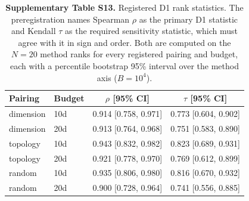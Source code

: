 \begin{table}[htbp]
\centering
\caption{\textbf{Supplementary Table S13.} Registered D1 rank statistics. The preregistration names Spearman $\rho$ as the primary D1 statistic and Kendall $\tau$ as the required sensitivity statistic, which must agree with it in sign and order. Both are computed on the $N=20$ method ranks for every registered pairing and budget, each with a percentile bootstrap 95\% interval over the method axis ($B=10^{4}$).}
\label{tab:si_d1_tau}
\SITableFont
\begin{tabular}{@{}llcc@{}}
\toprule
\textbf{Pairing} & \textbf{Budget} & $\rho$ [95\% CI] & $\tau$ [95\% CI] \\
\midrule
dimension & 10d & 0.914 [0.758, 0.971] & 0.773 [0.604, 0.902] \\
dimension & 20d & 0.913 [0.764, 0.968] & 0.751 [0.583, 0.890] \\
topology & 10d & 0.943 [0.832, 0.982] & 0.823 [0.689, 0.931] \\
topology & 20d & 0.921 [0.778, 0.970] & 0.769 [0.612, 0.899] \\
random & 10d & 0.935 [0.806, 0.980] & 0.816 [0.670, 0.932] \\
random & 20d & 0.900 [0.728, 0.964] & 0.741 [0.556, 0.885] \\
\bottomrule
\end{tabular}
\end{table}
